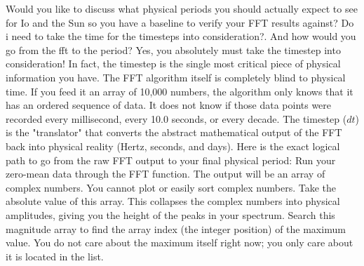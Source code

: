 {}\markdownRendererThematicBreak{}\markdownRendererInterblockSeparator
{}Would you like to discuss what physical periods you should actually expect to see for Io and the Sun so you have a baseline to verify your FFT results against?\markdownRendererInterblockSeparator
{}\markdownRendererThematicBreak{}\markdownRendererInterblockSeparator
{}
\markdownRendererSectionEnd 
\markdownRendererSectionEnd \markdownRendererSectionBegin
{}\markdownRendererInterblockSeparator
{}Do i need to take the time for the timesteps into consideration?. And how would you go from the fft to the period?\markdownRendererInterblockSeparator
{}
\markdownRendererSectionEnd \markdownRendererSectionBegin
{}\markdownRendererInterblockSeparator
{}Yes, you absolutely must take the timestep into consideration! In fact, the timestep is the single most critical piece of physical information you have.\markdownRendererInterblockSeparator
{}The FFT algorithm itself is completely blind to physical time. If you feed it an array of 10,000 numbers, the algorithm only knows that it has an ordered sequence of data. It does not know if those data points were recorded every millisecond, every 10.0 seconds, or every decade.\markdownRendererInterblockSeparator
{}The timestep ($dt$) is the "translator" that converts the abstract mathematical output of the FFT back into physical reality (Hertz, seconds, and days).\markdownRendererInterblockSeparator
{}Here is the exact logical path to go from the raw FFT output to your final physical period:\markdownRendererInterblockSeparator
{}\markdownRendererSectionBegin
{}\markdownRendererInterblockSeparator
{}\markdownRendererOlBegin
{} Run your zero-mean data through the FFT function. The output will be an array of complex numbers.\markdownRendererOlItemEnd 
{} You cannot plot or easily sort complex numbers. Take the absolute value of this array. This collapses the complex numbers into physical amplitudes, giving you the height of the peaks in your spectrum.\markdownRendererOlItemEnd 
{} Search this magnitude array to find the array index (the integer position) of the maximum value. You do not care about the maximum  itself right now; you only care about  it is located in the list.\markdownRendererOlItemEnd 
